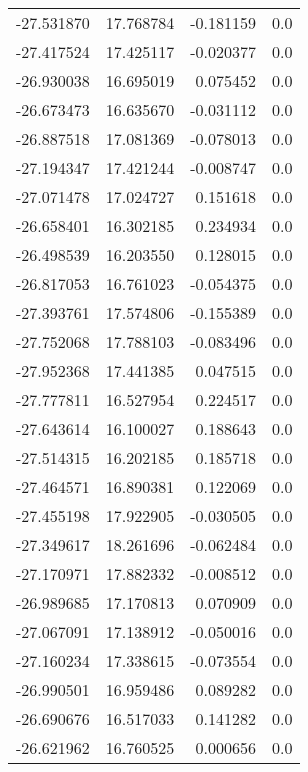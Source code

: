 \begin{tabular}{rrrr}
      -27.531870 &        17.768784 &   -0.181159 &   0.0 \\
      -27.417524 &        17.425117 &   -0.020377 &   0.0 \\
      -26.930038 &        16.695019 &    0.075452 &   0.0 \\
      -26.673473 &        16.635670 &   -0.031112 &   0.0 \\
      -26.887518 &        17.081369 &   -0.078013 &   0.0 \\
      -27.194347 &        17.421244 &   -0.008747 &   0.0 \\
      -27.071478 &        17.024727 &    0.151618 &   0.0 \\
      -26.658401 &        16.302185 &    0.234934 &   0.0 \\
      -26.498539 &        16.203550 &    0.128015 &   0.0 \\
      -26.817053 &        16.761023 &   -0.054375 &   0.0 \\
      -27.393761 &        17.574806 &   -0.155389 &   0.0 \\
      -27.752068 &        17.788103 &   -0.083496 &   0.0 \\
      -27.952368 &        17.441385 &    0.047515 &   0.0 \\
      -27.777811 &        16.527954 &    0.224517 &   0.0 \\
      -27.643614 &        16.100027 &    0.188643 &   0.0 \\
      -27.514315 &        16.202185 &    0.185718 &   0.0 \\
      -27.464571 &        16.890381 &    0.122069 &   0.0 \\
      -27.455198 &        17.922905 &   -0.030505 &   0.0 \\
      -27.349617 &        18.261696 &   -0.062484 &   0.0 \\
      -27.170971 &        17.882332 &   -0.008512 &   0.0 \\
      -26.989685 &        17.170813 &    0.070909 &   0.0 \\
      -27.067091 &        17.138912 &   -0.050016 &   0.0 \\
      -27.160234 &        17.338615 &   -0.073554 &   0.0 \\
      -26.990501 &        16.959486 &    0.089282 &   0.0 \\
      -26.690676 &        16.517033 &    0.141282 &   0.0 \\
      -26.621962 &        16.760525 &    0.000656 &   0.0 \\

\end{tabular}

